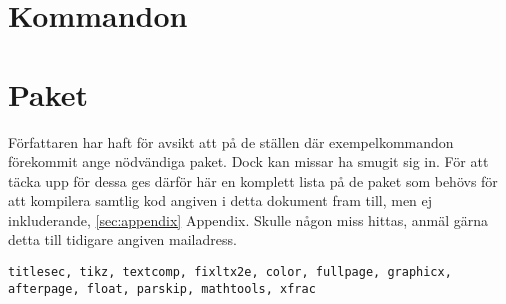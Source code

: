         \section{Kommandon}\label{sec:kommandon}
        

\section{Paket}\label{sec:paket}

Författaren har haft för avsikt att på de ställen där exempelkommandon förekommit ange nödvändiga paket. Dock kan missar ha smugit sig in. För att täcka upp för dessa ges därför här en komplett lista på de paket som behövs för att kompilera samtlig kod angiven i detta dokument fram till, men ej inkluderande, \ref{sec:appendix} Appendix. Skulle någon miss hittas, anmäl gärna detta till tidigare angiven mailadress.

\texttt{titlesec, tikz, textcomp, fixltx2e, color, fullpage, graphicx, afterpage, float, parskip, mathtools, xfrac}


